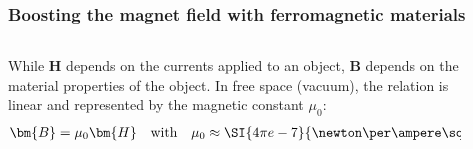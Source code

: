 \begin{frame}
	\frametitle{Boosting the magnet field with ferromagnetic materials}
	\begin{columns}
		\begin{column}{0.575\textwidth}
			While $\bm{H}$ depends on the currents applied to an object, $\bm{B}$ depends on the material properties of the object. In free space (vacuum), the relation is linear and represented by the magnetic constant $\mu_0$:
            \begin{align}
                \bm{B} = \mu_0 \bm{H} \quad \mbox{with} \quad \mu_0 \approx \SI{4 \pi e-7}{\newton\per\ampere\squared}.
            \end{align}
		\end{column}
        \hfill
		\begin{column}{0.425\textwidth}
            \vspace{-0.2cm}
			\begin{figure}
				\centering

\end{figure}
\end{column}
\end{columns}
\end{frame}
